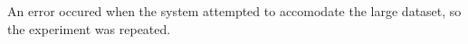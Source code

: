 An error occured when the system attempted to accomodate the large dataset, so the experiment was repeated.
